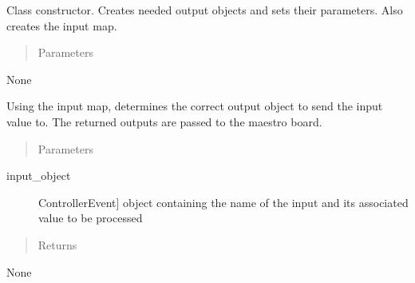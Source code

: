 \documentclass[letterpaper,10pt,english]{sphinxmanual}
\begin{document}
\begin{fulllineitems}
\begin{fulllineitems}
\label{\detokenize{mapping:MovementMap.MovementMap.__init__}}
\sphinxAtStartPar
Class constructor. Creates needed output objects and sets their parameters. Also creates the input map.
\begin{quote}\begin{description}
\item[{Parameters}] \leavevmode
\end{description}\end{quote}

\sphinxAtStartPar
None

\end{fulllineitems}


\begin{fulllineitems}
\label{\detokenize{mapping:MovementMap.MovementMap.process_input}}
\sphinxAtStartPar
Using the input map, determines the correct output object to send the input value to. The returned outputs are passed to the maestro board.
\begin{quote}\begin{description}
\item[{Parameters}] \leavevmode
\end{description}\end{quote}
\begin{description}
\item[{input\_object}] \leavevmode{[}ControllerEvent{]}
\sphinxAtStartPar
object containing the name of the input and its associated value to be processed

\end{description}
\begin{quote}\begin{description}
\item[{Returns}] \leavevmode
\end{description}\end{quote}

\sphinxAtStartPar
None

\end{fulllineitems}



\end{fulllineitems}
\end{document}

